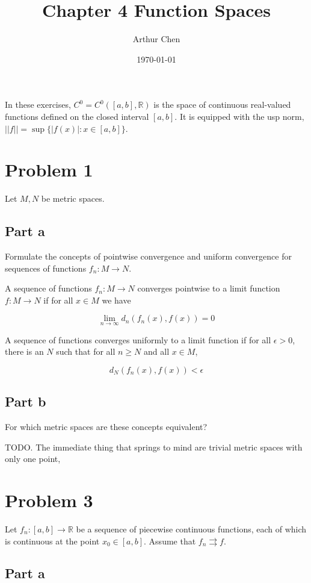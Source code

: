 \documentclass{article}
\author{Arthur Chen}
\title{Chapter 4 Function Spaces}
\date{\today}
\newcommand{\R}{\mathbb{R}}
\begin{document}
\maketitle

In these exercises, $C^0 = C^0([a, b], \R)$ is the space of continuous real-valued functions defined on the closed interval $[a, b]$. It is equipped with the usp norm, $||f|| = \sup \{|f(x)|: x \in [a, b]\}$.

\section*{Problem 1}

Let $M, N$ be metric spaces.

\subsection*{Part a}

Formulate the concepts of pointwise convergence and uniform convergence for sequences of functions $f_n: M \rightarrow N$.

A sequence of functions $f_n: M \rightarrow N$ converges pointwise to a limit function $f: M \rightarrow N$ if for all $x \in M$ we have

\[
\lim_{n \rightarrow \infty} d_n(f_n(x), f(x)) = 0
\]

A sequence of functions converges uniformly to a limit function if for all $\epsilon > 0$, there is an $N$ such that for all $n \geq N$ and all $x \in M$,

\[
d_N(f_n(x), f(x)) < \epsilon
\]

\subsection*{Part b}

For which metric spaces are these concepts equivalent?

TODO. The immediate thing that springs to mind are trivial metric spaces with only one point, 

\section*{Problem 3}

Let $f_n: [a, b] \rightarrow \R$ be a sequence of piecewise continuous functions, each of which is continuous at the point $x_0 \in [a, b]$. Assume that $f_n \rightrightarrows f$.

\subsection*{Part a}
\end{document}
